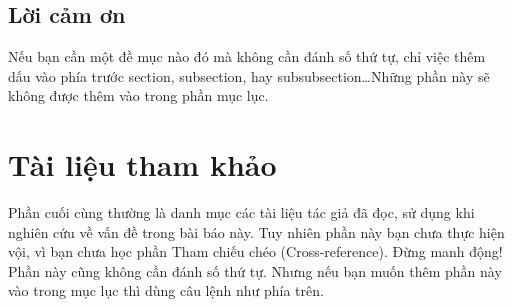 \documentclass[a4paper]{article}
\begin{document}
\subsection*{Lời cảm ơn}
Nếu bạn cần một đề mục nào đó mà không cần đánh số thứ tự, chỉ việc thêm dấu  vào phía trước section, subsection, hay subsubsection\ldots Những phần này sẽ không được thêm vào trong phần mục lục.

\section*{Tài liệu tham khảo}

Phần cuối cùng thường là danh mục các tài liệu tác giả đã đọc, sử dụng khi nghiên cứu về vấn đề trong bài báo này. 
Tuy nhiên phần này bạn chưa thực hiện vội, vì bạn chưa học phần Tham chiếu chéo (Cross-reference). Đừng manh động!
Phần này cũng không cần đánh số thứ tự. Nhưng nếu bạn muốn thêm phần này vào trong mục lục thì dùng câu lệnh như phía trên.
\end{document}
